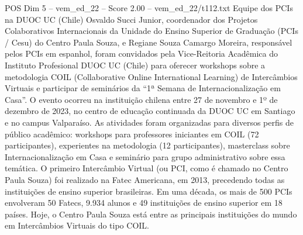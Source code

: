 \begin{textsample}{POS Dim 5 – vem\_ed\_22 – Score 2.00 – vem\_ed\_22/t112.txt}  \label{ex:f5_pos_095}
Equipe dos PCIs na DUOC UC (Chile) Osvaldo Succi Junior, coordenador dos Projetos Colaborativos Internacionais da Unidade do Ensino Superior de Graduação (PCIs / Cesu) do Centro Paula Souza, e Regiane Souza Camargo Moreira, responsável pelos PCIs em espanhol, foram convidados pela Vice-Reitoria Acadêmica do Instituto Profesional DUOC UC (Chile) para oferecer workshops sobre a metodologia COIL (Collaborative Online International Learning) de Intercâmbios Virtuais e participar de seminários da “1ª Semana de Internacionalização em Casa”.
O evento ocorreu na instituição chilena entre 27 de novembro e 1º de dezembro de 2023, no centro de educação continuada da DUOC UC em Santiago e no campus Valparaíso.
As atividades foram organizadas para diversos perfis de público acadêmico: workshops para professores iniciantes em COIL (72 participantes), experientes na metodologia (12 participantes), masterclass sobre Internacionalização em Casa e seminário para grupo administrativo sobre essa temática.
O primeiro Intercâmbio Virtual (ou PCI, como é chamado no Centro Paula Souza) foi realizado na Fatec Americana, em 2013, precedendo todas as instituições de ensino superior brasileiras.
Em uma década, os mais de 500 PCIs envolveram 50 Fatecs, 9.934 alunos e 49 instituições de ensino superior em 18 países.
Hoje, o Centro Paula Souza está entre as principais instituições do mundo em Intercâmbios Virtuais do tipo COIL.

\end{textsample}
